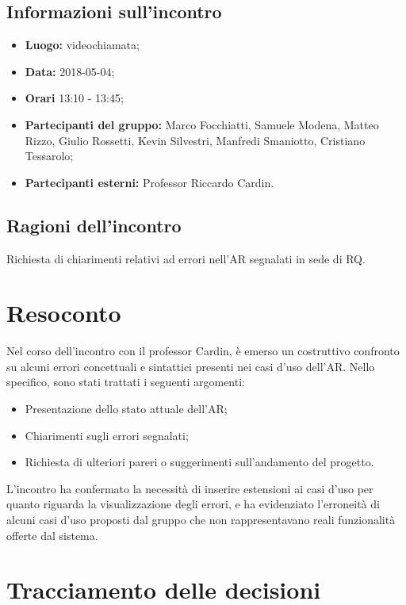 \documentclass[openany,12pt,a4paper]{article}
\begin{document}
  \subsection{Informazioni sull'incontro} 
   
  \begin{itemize}  
      \item \textbf{Luogo:} videochiamata;
      \item \textbf{Data:} 2018-05-04; 
      \item \textbf{Orari} 13:10 - 13:45;
      \item \textbf{Partecipanti del gruppo:} Marco Focchiatti, Samuele Modena, Matteo Rizzo, Giulio Rossetti, Kevin Silvestri, Manfredi Smaniotto, Cristiano Tessarolo; 
      \item \textbf{Partecipanti esterni:} Professor Riccardo Cardin. 
  \end{itemize} 
 
  \subsection{Ragioni dell'incontro} 
  Richiesta di chiarimenti relativi ad errori nell'AR segnalati in sede di RQ. 
 
  \section{Resoconto} 
  Nel corso dell'incontro con il professor Cardin, è emerso un costruttivo confronto su alcuni errori concettuali e sintattici presenti nei casi d'uso dell'AR. Nello specifico, sono stati trattati i seguenti argomenti: 
  
  \begin{itemize}
  	\item Presentazione dello stato attuale dell'AR;
    \item Chiarimenti sugli errori segnalati;
    \item Richiesta di ulteriori pareri o suggerimenti sull'andamento del progetto.
    
  \end{itemize}
  
  L'incontro ha confermato la necessità di inserire estensioni ai casi d'uso per quanto riguarda la visualizzazione degli errori, e ha evidenziato l'erroneità di alcuni casi d'uso proposti dal gruppo che non rappresentavano reali funzionalità offerte dal sistema.
  
  \section{Tracciamento delle decisioni} 
   
\end{document}
